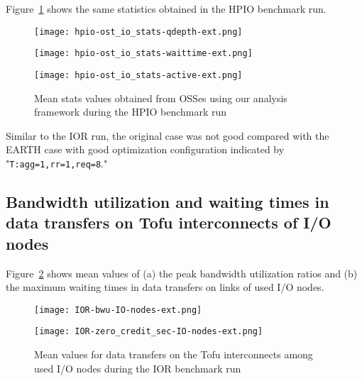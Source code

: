 \documentclass{jhps}
\begin{document}
Figure~\ref{fig:HPIO_OST_IO_STATS} shows the same statistics obtained
in the HPIO benchmark run.
%
\begin{figure}[htb]
\centering
\begin{minipage}[t]{0.44\textwidth}
 \centering
 \texttt{[image: hpio-ost\_io\_stats-qdepth-ext.png]}
 \label{fig:HPIO_req_qdepth}
\end{minipage}
%
\noindent
\begin{minipage}[t]{0.44\textwidth}
 \centering
 \texttt{[image: hpio-ost\_io\_stats-waittime-ext.png]}
 \label{fig:HPIO_req_waittime}
\end{minipage}
%
\noindent
\begin{minipage}[t]{0.44\textwidth}
 \centering
 \texttt{[image: hpio-ost\_io\_stats-active-ext.png]}
 \label{fig:HPIO_req_active}
\end{minipage}
%
\caption{Mean stats values obtained from OSSes using our analysis framework
during the HPIO benchmark run}
\label{fig:HPIO_OST_IO_STATS}
\end{figure}
%
Similar to the IOR run, the original case was not good compared
with the EARTH case with good optimization configuration
indicated by "{\tt T:agg=1,rr=1,req=8}."

\subsection{Bandwidth utilization and waiting times in data transfers on Tofu interconnects of I/O nodes}

Figure~\ref{fig:IOR_ION_TOFU_BWU_WAIT_TIME} shows mean values of
(a) the peak bandwidth utilization ratios and
(b) the maximum waiting times in data transfers on links of used I/O nodes.
%
\begin{figure}[htb]
\centering
\begin{minipage}[t]{0.48\textwidth}
 \centering
 \texttt{[image: IOR-bwu-IO-nodes-ext.png]}
 \label{fig:IOR_ION_TOFU_BW_UTIL}
\end{minipage}
%
\noindent
\begin{minipage}[t]{0.48\textwidth}
 \centering
 \texttt{[image: IOR-zero\_credit\_sec-IO-nodes-ext.png]}
 \label{fig:IOR_ION_TOFU_WAIT_TIME}
\end{minipage}
\caption{
Mean values for data transfers on the Tofu interconnects among used I/O nodes
during the IOR benchmark run}
\label{fig:IOR_ION_TOFU_BWU_WAIT_TIME}
\end{figure}
%
\end{document}
